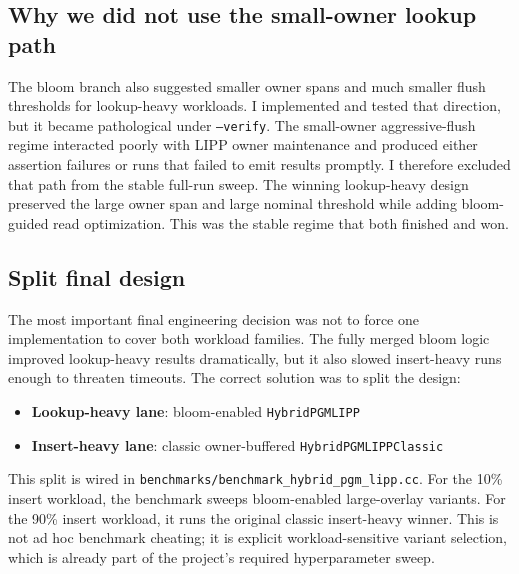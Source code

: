 \documentclass[11pt]{article}
\begin{document}
\subsection*{Why we did not use the small-owner lookup path}
The bloom branch also suggested smaller owner spans and much smaller flush thresholds for lookup-heavy workloads. I implemented and tested that direction, but it became pathological under \texttt{--verify}. The small-owner aggressive-flush regime interacted poorly with LIPP owner maintenance and produced either assertion failures or runs that failed to emit results promptly. I therefore excluded that path from the stable full-run sweep. The winning lookup-heavy design preserved the large owner span and large nominal threshold while adding bloom-guided read optimization. This was the stable regime that both finished and won.

\subsection*{Split final design}
The most important final engineering decision was not to force one implementation to cover both workload families. The fully merged bloom logic improved lookup-heavy results dramatically, but it also slowed insert-heavy runs enough to threaten timeouts. The correct solution was to split the design:
\begin{itemize}
  \item \textbf{Lookup-heavy lane}: bloom-enabled \texttt{HybridPGMLIPP}
  \item \textbf{Insert-heavy lane}: classic owner-buffered \texttt{HybridPGMLIPPClassic}
\end{itemize}
This split is wired in \texttt{benchmarks/benchmark\_hybrid\_pgm\_lipp.cc}. For the 10\% insert workload, the benchmark sweeps bloom-enabled large-overlay variants. For the 90\% insert workload, it runs the original classic insert-heavy winner. This is not ad hoc benchmark cheating; it is explicit workload-sensitive variant selection, which is already part of the project's required hyperparameter sweep.
\end{document}
